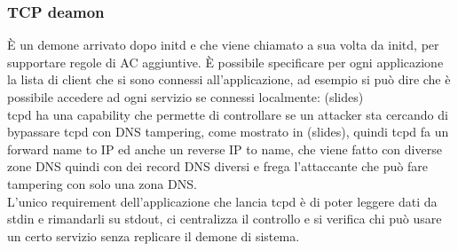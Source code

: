\documentclass[12pt, oneside]{extbook} %
\begin{document}
\subsubsection{TCP deamon}
È un demone arrivato dopo initd e che viene chiamato a sua volta da initd, per supportare regole di AC aggiuntive. È possibile specificare per ogni applicazione la lista di client che si sono connessi all'applicazione, ad esempio si può dire che è possibile accedere ad ogni servizio se connessi localmente: (slides)\\tcpd ha una capability che permette di controllare se un attacker sta cercando di bypassare tcpd con DNS tampering, come mostrato in (slides), quindi tcpd fa un forward name to IP ed anche un reverse IP to name, che viene fatto con diverse zone DNS quindi con dei record DNS diversi e frega l'attaccante che può fare tampering con solo una zona DNS.\\L'unico requirement dell'applicazione che lancia tcpd è di poter leggere dati da stdin e rimandarli su stdout, ci centralizza il controllo e si verifica chi può usare un certo servizio senza replicare il demone di sistema.
\end{document}

